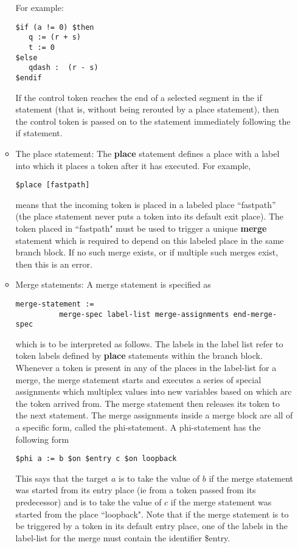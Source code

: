 \documentclass{article}
\begin{document}
\begin{itemize}
\begin{itemize}
\begin{verbatim}
\end{verbatim}
For example:
\begin{verbatim}
$if (a != 0) $then
   q := (r + s)
   t := 0
$else
   qdash :  (r - s)
$endif
\end{verbatim}
If the control token reaches the end of a selected
segment in the if statement (that is, without being
rerouted by a place statement), then the control
token is passed on to the statement immediately
following the if statement.
\item The place statement: The {\bf place} statement
defines a place with a label  into which it places
a token after it has executed.  For example,
\begin{verbatim}
$place [fastpath]
\end{verbatim}
means that the incoming token is placed in a labeled
place ``fastpath'' (the place statement never
puts a token into its default exit place).  
The token placed in ``fastpath" must be used to
trigger a unique {\bf merge} statement which is required
to depend on this labeled place in the same branch
block. If no such merge exists, or if multiple such merges exist, 
then this is an error.
\item Merge statements: A merge statement is
specified as 
\begin{verbatim}
merge-statement :=
          merge-spec label-list merge-assignments end-merge-spec
\end{verbatim}
which is to be interpreted as follows.  The labels in the label list
refer to token labels defined by {\bf place}  statements within the branch block.
Whenever a token is present in any of the places in
the label-list for a merge,
the merge statement starts and executes a series of special assignments
which multiplex values into new variables based on which arc the
token arrived from.  The merge statement then releases its token to
the next statement. 
The merge assignments inside a merge block are all of a specific
form, called the phi-statement.  A phi-statement has the following
form
\begin{verbatim}
$phi a := b $on $entry c $on loopback 
\end{verbatim}
This says that the target $a$ is to take the value of $b$ if
the merge statement was started from its entry place (ie from a
token passed from its predecessor) and is to take the value of $c$
if the merge statement was started from the place ``loopback".
Note that if the merge statement is to be triggered by a
token in its default entry place, one of the labels in the
label-list for the merge must contain the identifier \$entry.
\end{itemize}


\end{itemize}
\end{document}
